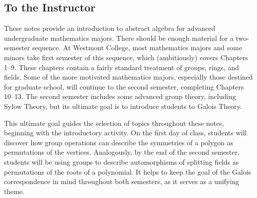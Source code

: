 \tableofcontents


\begin{annotation}
 \chapter{To the Instructor}

These notes provide an introduction to abstract algebra for advanced undergraduate mathematics majors. There should be enough material for a two-semester sequence. At Westmont College, most mathematics majors and some minors take first semester of this sequence, which (ambitiously) covers Chapters 1--9. These chapters contain a fairly standard treatment of groups, rings, and fields. Some of the more motivated mathematics majors, especially those destined for graduate school, will continue to the second semester, completing Chapters 10--13. The second semester includes some advanced group theory, including Sylow Theory, but its ultimate goal is to introduce students to Galois Theory.

This ultimate goal guides the selection of topics throughout these notes, beginning with the introductory activity. On the first day of class, students will discover how group operations can describe the symmetries of a polygon as permutations of the vertices. Analogously, by the end of the second semester, students will be using groups to describe automorphisms of splitting fields as permutations of the roots of a polynomial. It helps to keep the goal of the Galois correspondence in mind throughout both semesters, as it serves as a unifying theme.


\end{annotation}
